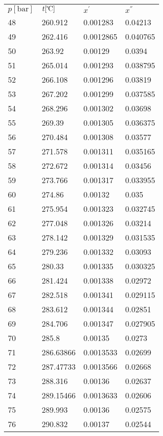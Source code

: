 \documentclass[twocolumn]{article}
\begin{document}
\begin{tabular}{l|l|l|l}
$p [\text{bar}] $ & $t [\text{\textcelsius{}}]$ & $x^{'}$ & $x^{''}$ \\
48	&	260.912	&	0.001283	&	0.04213  \\ \hline
49	&	262.416	&	0.0012865	&	0.040765  \\ \hline
50	&	263.92	&	0.00129	&	0.0394  \\ \hline
51	&	265.014	&	0.001293	&	0.038795  \\ \hline
52	&	266.108	&	0.001296	&	0.03819  \\ \hline
53	&	267.202	&	0.001299	&	0.037585  \\ \hline
54	&	268.296	&	0.001302	&	0.03698  \\ \hline
55	&	269.39	&	0.001305	&	0.036375  \\ \hline
56	&	270.484	&	0.001308	&	0.03577  \\ \hline
57	&	271.578	&	0.001311	&	0.035165  \\ \hline
58	&	272.672	&	0.001314	&	0.03456  \\ \hline
59	&	273.766	&	0.001317	&	0.033955  \\ \hline
60	&	274.86	&	0.00132	&	0.035  \\ \hline
61	&	275.954	&	0.001323	&	0.032745  \\ \hline
62	&	277.048	&	0.001326	&	0.03214  \\ \hline
63	&	278.142	&	0.001329	&	0.031535  \\ \hline
64	&	279.236	&	0.001332	&	0.03093  \\ \hline
65	&	280.33	&	0.001335	&	0.030325  \\ \hline
66	&	281.424	&	0.001338	&	0.02972  \\ \hline
67	&	282.518	&	0.001341	&	0.029115  \\ \hline
68	&	283.612	&	0.001344	&	0.02851  \\ \hline
69	&	284.706	&	0.001347	&	0.027905  \\ \hline
70	&	285.8	&	0.00135	&	0.0273  \\ \hline
71	&	286.63866&	0.0013533&	0.02699  \\ \hline
72	&	287.47733&	0.0013566&	0.02668  \\ \hline
73	&	288.316	&	0.00136	&	0.02637  \\ \hline
74	&	289.15466&	0.0013633&	0.02606  \\ \hline
75	&	289.993&	0.00136&	0.02575  \\ \hline
76	&	290.832	&	0.00137	&	0.02544  \\ \hline

\end{tabular}
\end{document}
